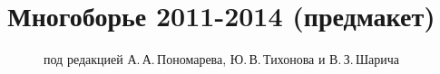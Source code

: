 \title{Многоборье 2011-2014 (предмакет)}\date{}
\author{под редакцией А.\,А.\,Пономарева, Ю.\,В.\,Тихонова и В.\,З.\,Шарича}
\maketitle

\tableofcontents

